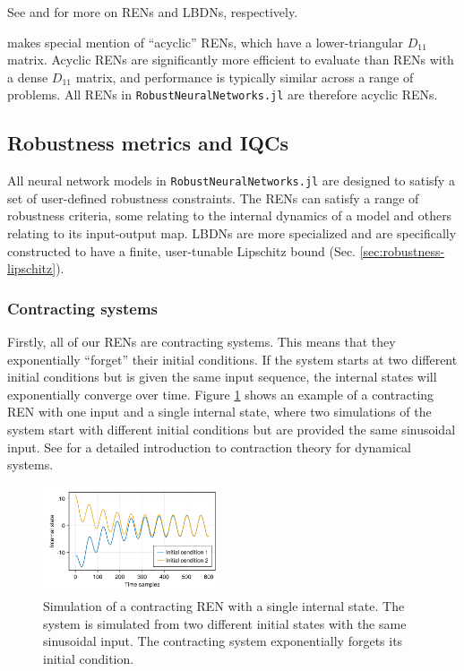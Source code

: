 See \cite{Revay++2021b} and \cite{Wang+Manchester2023} for more on RENs and LBDNs, respectively.

\begin{remark}
	\cite{Revay++2021b} makes special mention of ``acyclic'' RENs, which have a lower-triangular $D_{11}$ matrix. Acyclic RENs are significantly more efficient to evaluate than RENs with a dense $D_{11}$ matrix, and performance is typically similar across a range of problems. All RENs in \verb|RobustNeuralNetworks.jl| are therefore acyclic RENs.
\end{remark}

\subsection{Robustness metrics and IQCs} \label{sec:robustness}

All neural network models in \verb|RobustNeuralNetworks.jl| are designed to satisfy a set of user-defined robustness constraints. The RENs can satisfy a range of robustness criteria, some relating to the internal dynamics of a model and others relating to its input-output map. LBDNs are more specialized and are specifically constructed to have a finite, user-tunable Lipschitz bound (Sec. \ref{sec:robustness-lipschitz}).

\subsubsection{Contracting systems} \label{sec:robustness-contraction}

Firstly, all of our RENs are contracting systems. This means that they exponentially ``forget'' their initial conditions. If the system starts at two different initial conditions but is given the same input sequence, the internal states will exponentially converge over time. Figure \ref{fig:contracting-ren} shows an example of a contracting REN with one input and a single internal state, where two simulations of the system start with different initial conditions but are provided the same sinusoidal input. See \cite{Bullo2022} for a detailed introduction to contraction theory for dynamical systems.

\begin{figure}[ht]
    \centering
    \includegraphics[width=0.47\textwidth]{Images/contracting_ren.pdf}
    \caption{Simulation of a contracting REN with a single internal state. The system is simulated from two different initial states with the same sinusoidal input. The contracting system exponentially forgets its initial condition.}
    \label{fig:contracting-ren}
\end{figure}

